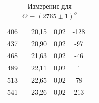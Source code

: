 \documentclass[a4paper,12pt]{report}
\begin{document}
\begin{table}[H]
\begin{tabular}{|c|c|c|c|c|c|}
406 &                     & 20,15 & 0,02 & -128 &                     \\ \cline{1-1} \cline{3-5}
437 &                     & 20,90 & 0,02 & -97  &                     \\ \cline{1-1} \cline{3-5}
468 &                     & 21,63 & 0,02 & -46  &                     \\ \cline{1-1} \cline{3-5}
489 &                     & 22,11 & 0,02 & 1    &                     \\ \cline{1-1} \cline{3-5}
513 &                     & 22,65 & 0,02 & 78   &                     \\ \cline{1-1} \cline{3-5}
541 &                     & 23,26 & 0,02 & 213  &                     \\ \hline
\end{tabular}
\caption{Измерение для $\Theta = (2765\pm 1) ^{o}$}
\end{table}
\end{document}
